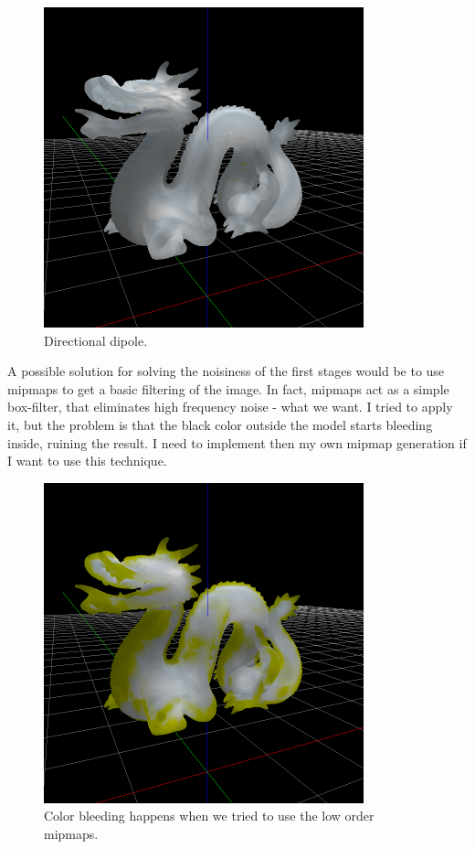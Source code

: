 \documentclass[12pt, twoside,a4paper]{article}
\begin{document}
\begin{figure}[!h]
\centering
\includegraphics[width=350px]{jeppe_120_100_frames.png}
\caption{Directional dipole.}
\label{fig:img}
\end{figure}

\clearpage
A possible solution for solving the noisiness of the first stages would be to use mipmaps to get a basic filtering of the image. In fact, mipmaps act as a simple box-filter, that eliminates high frequency noise - what we want. I tried to apply it, but the problem is that the black color outside the model starts bleeding inside, ruining the result. I need to implement then my own mipmap generation if I want to use this technique.

\vspace{0.5cm}
\begin{figure}[!h]
\centering
\includegraphics[width=350px]{lod.png}
\caption{Color bleeding happens when we tried to use the low order mipmaps.}
\label{fig:img}
\end{figure}
\end{document}
